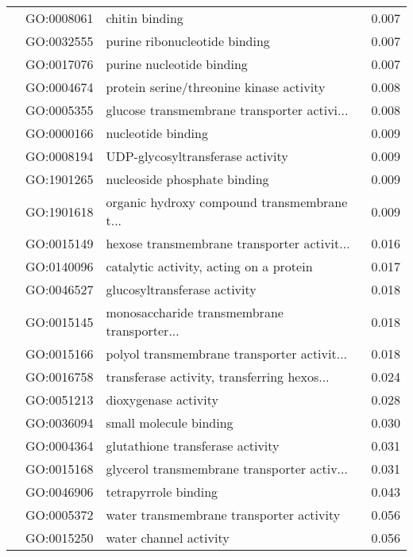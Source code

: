 \begin{longtable}{lllr}
   & GO:0008061 &                               chitin binding &         0.007 \\
   & GO:0032555 &                purine ribonucleotide binding &         0.007 \\
   & GO:0017076 &                    purine nucleotide binding &         0.007 \\
   & GO:0004674 &     protein serine/threonine kinase activity &         0.008 \\
   & GO:0005355 &  glucose transmembrane transporter activi... &         0.008 \\
   & GO:0000166 &                           nucleotide binding &         0.009 \\
   & GO:0008194 &             UDP-glycosyltransferase activity &         0.009 \\
   & GO:1901265 &                 nucleoside phosphate binding &         0.009 \\
   & GO:1901618 &  organic hydroxy compound transmembrane t... &         0.009 \\
   & GO:0015149 &  hexose transmembrane transporter activit... &         0.016 \\
   & GO:0140096 &      catalytic activity, acting on a protein &         0.017 \\
   & GO:0046527 &                 glucosyltransferase activity &         0.018 \\
   & GO:0015145 &  monosaccharide transmembrane transporter... &         0.018 \\
   & GO:0015166 &  polyol transmembrane transporter activit... &         0.018 \\
   & GO:0016758 &  transferase activity, transferring hexos... &         0.024 \\
   & GO:0051213 &                         dioxygenase activity &         0.028 \\
   & GO:0036094 &                       small molecule binding &         0.030 \\
   & GO:0004364 &             glutathione transferase activity &         0.031 \\
   & GO:0015168 &  glycerol transmembrane transporter activ... &         0.031 \\
   & GO:0046906 &                         tetrapyrrole binding &         0.043 \\
   & GO:0005372 &     water transmembrane transporter activity &         0.056 \\
   & GO:0015250 &                       water channel activity &         0.056 \\

\end{longtable}
